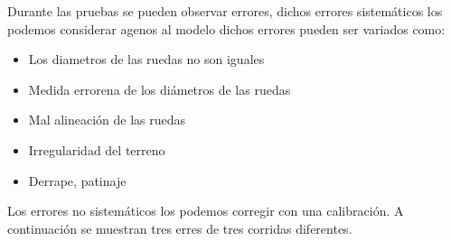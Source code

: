 \documentclass[oneside,twocolumn]{article}
\begin{document}
Durante las pruebas se pueden observar errores, dichos errores sistemáticos los podemos considerar agenos al modelo dichos errores pueden ser variados como:
\begin{itemize}
\item Los diametros de las ruedas no son iguales
\item Medida errorena de los diámetros de las ruedas
\item Mal alineación de las ruedas
\item Irregularidad del terreno
\item Derrape, patinaje
\end{itemize}

Los errores no sistemáticos los podemos corregir con una calibración. A continuación se muestran tres erres de tres corridas diferentes.
\end{document}
